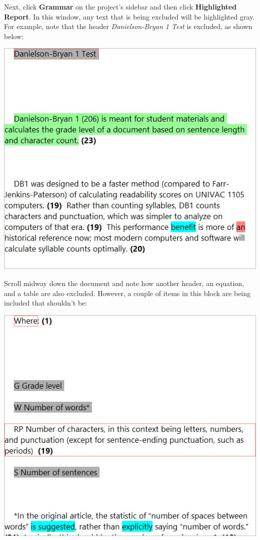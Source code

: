\documentclass[
]{book}
\theoremstyle{definition}
\theoremstyle{definition}
\theoremstyle{definition}
\theoremstyle{definition}
\theoremstyle{remark}
\begin{document}
Next, click \textbf{Grammar} on the project's sidebar and then click \textbf{Highlighted Report}. In this window, any text that is being excluded will be highlighted gray. For example, note that the header \emph{Danielson-Bryan 1 Test} is excluded, as shown below:

\begin{center}\includegraphics[width=0.75\linewidth,]{Images/ExclusionExampleHeaderExcluded} \end{center}

Scroll midway down the document and note how another header, an equation, and a table are also excluded. However, a couple of items in this block are being included that shouldn't be:

\begin{center}\includegraphics[width=0.75\linewidth,]{Images/ExclusionExamplePartialExcluded} \end{center}
\end{document}
